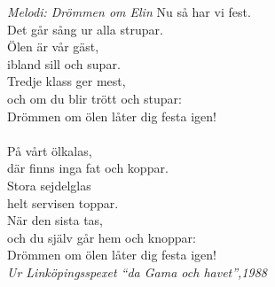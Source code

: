 {\footnotesize\textit{Melodi: Drömmen om Elin}}
\vspace{10pt}
Nu så har vi fest.\\
Det går sång ur alla strupar.\\
Ölen är vår gäst,\\
ibland sill och supar.\\
Tredje klass ger mest,\\
och om du blir trött och stupar:\\
Drömmen om ölen låter dig festa igen!\\
\\
På vårt ölkalas,\\
där finns inga fat och koppar.\\
Stora sejdelglas\\
helt servisen toppar.\\
När den sista tas,\\
och du själv går hem och knoppar:\\
Drömmen om ölen låter dig festa igen!\\
\vspace{10pt}
{\footnotesize\textit{Ur Linköpingsspexet ``da Gama och havet'',1988}}
